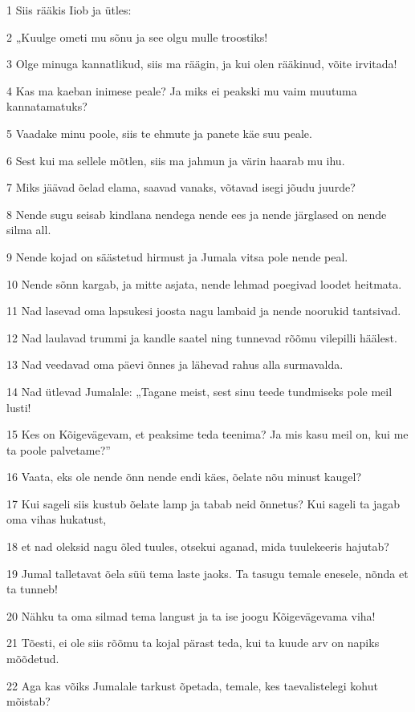 \par 1 Siis rääkis Iiob ja ütles:
\par 2 „Kuulge ometi mu sõnu ja see olgu mulle troostiks!
\par 3 Olge minuga kannatlikud, siis ma räägin, ja kui olen rääkinud, võite irvitada!
\par 4 Kas ma kaeban inimese peale? Ja miks ei peakski mu vaim muutuma kannatamatuks?
\par 5 Vaadake minu poole, siis te ehmute ja panete käe suu peale.
\par 6 Sest kui ma sellele mõtlen, siis ma jahmun ja värin haarab mu ihu.
\par 7 Miks jäävad õelad elama, saavad vanaks, võtavad isegi jõudu juurde?
\par 8 Nende sugu seisab kindlana nendega nende ees ja nende järglased on nende silma all.
\par 9 Nende kojad on säästetud hirmust ja Jumala vitsa pole nende peal.
\par 10 Nende sõnn kargab, ja mitte asjata, nende lehmad poegivad loodet heitmata.
\par 11 Nad lasevad oma lapsukesi joosta nagu lambaid ja nende noorukid tantsivad.
\par 12 Nad laulavad trummi ja kandle saatel ning tunnevad rõõmu vilepilli häälest.
\par 13 Nad veedavad oma päevi õnnes ja lähevad rahus alla surmavalda.
\par 14 Nad ütlevad Jumalale: „Tagane meist, sest sinu teede tundmiseks pole meil lusti!
\par 15 Kes on Kõigevägevam, et peaksime teda teenima? Ja mis kasu meil on, kui me ta poole palvetame?”
\par 16 Vaata, eks ole nende õnn nende endi käes, õelate nõu minust kaugel?
\par 17 Kui sageli siis kustub õelate lamp ja tabab neid õnnetus? Kui sageli ta jagab oma vihas hukatust,
\par 18 et nad oleksid nagu õled tuules, otsekui aganad, mida tuulekeeris hajutab?
\par 19 Jumal talletavat õela süü tema laste jaoks. Ta tasugu temale enesele, nõnda et ta tunneb!
\par 20 Nähku ta oma silmad tema langust ja ta ise joogu Kõigevägevama viha!
\par 21 Tõesti, ei ole siis rõõmu ta kojal pärast teda, kui ta kuude arv on napiks mõõdetud.
\par 22 Aga kas võiks Jumalale tarkust õpetada, temale, kes taevalistelegi kohut mõistab?
